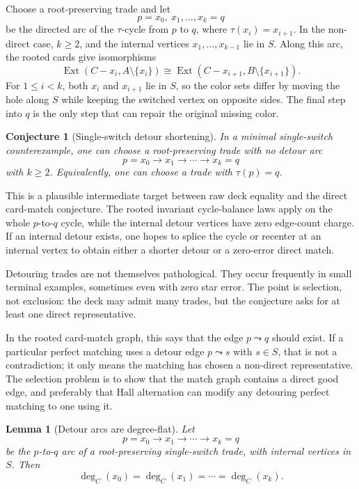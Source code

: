 \documentclass[11pt]{article}
\newtheorem{lemma}{Lemma}
\newtheorem{conjecture}{Conjecture}
\newcommand{\Ext}{\operatorname{Ext}}
\begin{document}
Choose a root-preserving trade and let
\[
  p=x_0,\ x_1,\ldots,x_k=q
\]
be the directed arc of the \(\tau\)-cycle from \(p\) to \(q\), where
\(\tau(x_i)=x_{i+1}\).  In the non-direct case, \(k\geq 2\), and the internal
vertices \(x_1,\ldots,x_{k-1}\) lie in \(S\).  Along this arc, the rooted
cards give isomorphisms
\[
  \Ext(C-x_i,A\setminus\{x_i\})
  \cong
  \Ext(C-x_{i+1},B\setminus\{x_{i+1}\}).
\]
For \(1\leq i<k\), both \(x_i\) and \(x_{i+1}\) lie in \(S\), so the color
sets differ by moving the hole along \(S\) while keeping the switched vertex
on opposite sides.  The final step into \(q\) is the only step that can repair
the original missing color.

\begin{conjecture}[Single-switch detour shortening]
In a minimal single-switch counterexample, one can choose a root-preserving
trade with no detour arc
\[
  p=x_0\to x_1\to\cdots\to x_k=q
\]
with \(k\geq 2\).  Equivalently, one can choose a trade with \(\tau(p)=q\).
\end{conjecture}

This is a plausible intermediate target between raw deck equality and the
direct card-match conjecture.  The rooted invariant cycle-balance laws apply
on the whole \(p\)-to-\(q\) cycle, while the internal detour vertices have
zero edge-count charge.  If an internal detour exists, one hopes to splice the
cycle or recenter at an internal vertex to obtain either a shorter detour or a
zero-error direct match.

Detouring trades are not themselves pathological.  They occur frequently in
small terminal examples, sometimes even with zero star error.  The point is
selection, not exclusion: the deck may admit many trades, but the conjecture
asks for at least one direct representative.

In the rooted card-match graph, this says that the edge \(p\leadsto q\) should
exist.  If a particular perfect matching uses a detour edge \(p\leadsto s\)
with \(s\in S\), that is not a contradiction; it only means the matching has
chosen a non-direct representative.  The selection problem is to show that
the match graph contains a direct good edge, and preferably that Hall
alternation can modify any detouring perfect matching to one using it.

\begin{lemma}[Detour arcs are degree-flat]
Let
\[
  p=x_0\to x_1\to\cdots\to x_k=q
\]
be the \(p\)-to-\(q\) arc of a root-preserving single-switch trade, with
internal vertices in \(S\).  Then
\[
  \deg_C(x_0)=\deg_C(x_1)=\cdots=\deg_C(x_k).
\]
\end{lemma}
\end{document}
